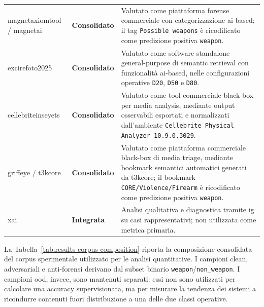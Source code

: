 \begin{table}[H]
\begin{tabularx}{\textwidth}{@{}p{} p{} X@{}}
\gls{magnetaxiomtool} / \gls{magnetai} &
\textbf{Consolidato} &
Valutato come piattaforma forense commerciale con categorizzazione
\gls{ai}-based; il tag \texttt{Possible weapons} è ricodificato come predizione
positiva \texttt{weapon}. \\

\gls{excirefoto2025} &
\textbf{Consolidato} &
Valutato come software standalone general-purpose di semantic retrieval con
funzionalità \gls{ai}-based, nelle configurazioni operative \texttt{D20},
\texttt{D50} e \texttt{D80}. \\

\gls{cellebriteinseyets} &
\textbf{Consolidato} &
Valutato come tool commerciale black-box per media analysis, mediante output
osservabili esportati e normalizzati dall'ambiente \texttt{Cellebrite Physical
Analyzer 10.9.0.3029}. \\

\gls{griffeye} / \gls{t3kcore} &
\textbf{Consolidato} &
Valutato come piattaforma commerciale black-box di media triage, mediante
bookmark semantici automatici generati da \gls{t3kcore}; il bookmark
\texttt{CORE/Violence/Firearm} è ricodificato come predizione positiva
\texttt{weapon}. \\

\gls{xai} &
\textbf{Integrata} &
Analisi qualitativa e diagnostica tramite \gls{ig} su casi rappresentativi; non
utilizzata come metrica primaria. \\

\bottomrule
\end{tabularx}
\end{table}



La Tabella~\ref{tab:results-corpus-composition} riporta la composizione
consolidata del corpus sperimentale utilizzato per le analisi quantitative. I
campioni clean, adversariali e anti-forensi derivano dal subset binario
\texttt{weapon}/\texttt{non\_weapon}. I campioni \gls{ood}, invece, sono
mantenuti separati: essi non sono utilizzati per calcolare una accuracy
supervisionata, ma per misurare la tendenza dei sistemi a ricondurre contenuti
fuori distribuzione a una delle due classi operative.

